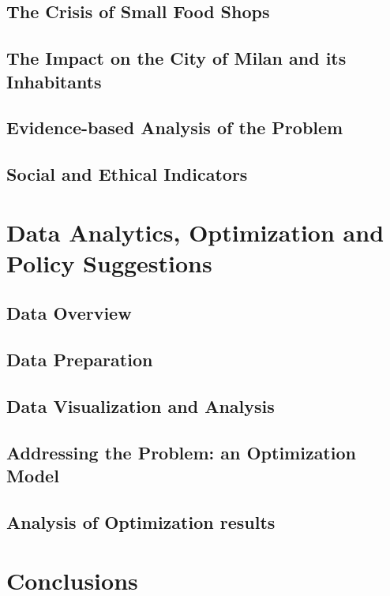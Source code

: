 \subsection{The Crisis of Small Food Shops}

\subsection{The Impact on the City of Milan and its Inhabitants}

\subsection{Evidence-based Analysis of the Problem}

\subsection{Social and Ethical Indicators}




\newpage
\section{Data Analytics, Optimization and Policy Suggestions}

\subsection{Data Overview}

\subsection{Data Preparation}

\subsection{Data Visualization and Analysis}

\subsection{Addressing the Problem: an Optimization Model}

\subsection{Analysis of Optimization results}

\section*{Conclusions}



